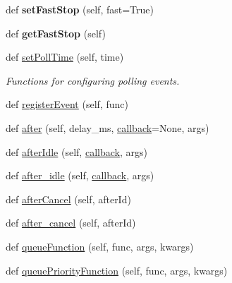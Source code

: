 \begin{DoxyCompactItemize}
\item 
\mbox{\label{class_python_01_g_u_i_1_1appjar_1_1gui_a8566680125ed489e7a61d663afcddd2e}} 
def {\bfseries set\+Fast\+Stop} (self, fast=True)
\item 
\mbox{\label{class_python_01_g_u_i_1_1appjar_1_1gui_a01d609098525eb0c832459d118852eb5}} 
def {\bfseries get\+Fast\+Stop} (self)
\item 
def \hyperlink{class_python_01_g_u_i_1_1appjar_1_1gui_a40a95de7523923bfc5155bf7a5b19ce2}{set\+Poll\+Time} (self, time)
\begin{DoxyCompactList}\small\item\em Functions for configuring polling events. \end{DoxyCompactList}\item 
def \hyperlink{class_python_01_g_u_i_1_1appjar_1_1gui_ab8bd68b0741ebaad2a1077a29fceeaeb}{register\+Event} (self, func)
\item 
def \hyperlink{class_python_01_g_u_i_1_1appjar_1_1gui_a93a8c682a2fbc1fa491a0224e24fecc8}{after} (self, delay\+\_\+ms, \hyperlink{class_python_01_g_u_i_1_1appjar_1_1gui_aa23620962e130effb8dc9dd15198cd50}{callback}=None, args)
\item 
def \hyperlink{class_python_01_g_u_i_1_1appjar_1_1gui_a055131e89a6aebf80b238aecea8f4cc6}{after\+Idle} (self, \hyperlink{class_python_01_g_u_i_1_1appjar_1_1gui_aa23620962e130effb8dc9dd15198cd50}{callback}, args)
\item 
def \hyperlink{class_python_01_g_u_i_1_1appjar_1_1gui_a4944a0330a3d190f85180524670393d6}{after\+\_\+idle} (self, \hyperlink{class_python_01_g_u_i_1_1appjar_1_1gui_aa23620962e130effb8dc9dd15198cd50}{callback}, args)
\item 
def \hyperlink{class_python_01_g_u_i_1_1appjar_1_1gui_a714ba2f2038b43891963126d59a493dc}{after\+Cancel} (self, after\+Id)
\item 
def \hyperlink{class_python_01_g_u_i_1_1appjar_1_1gui_aa76abbe29ba1e69540f58126aa43e127}{after\+\_\+cancel} (self, after\+Id)
\item 
def \hyperlink{class_python_01_g_u_i_1_1appjar_1_1gui_aa1f4470e86a68404917803bdc62a6a2a}{queue\+Function} (self, func, args, kwargs)
\item 
def \hyperlink{class_python_01_g_u_i_1_1appjar_1_1gui_a007f99a59cbbd3f24f98b452fb8fec02}{queue\+Priority\+Function} (self, func, args, kwargs)
\item 

\end{DoxyCompactItemize}
